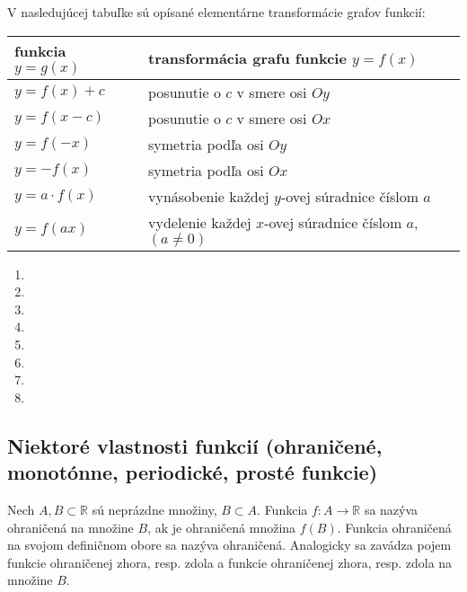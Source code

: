 V nasledujúcej tabuľke sú opísané elementárne transformácie grafov funkcií:

\begin{center}
  \begin{tabular}{|p{}|p{}|}
    \hline
    {\bf funkcia $y=g(x)$} & {\bf transformácia grafu funkcie $y=f(x)$}  \\
    \hline
    $y = f(x) + c$     & posunutie o $c$ v smere osi $Oy$ \\
    $y = f(x - c)$     & posunutie o $c$ v smere osi $Ox$ \\
    $y = f(-x)$        & symetria podľa osi $Oy$ \\
    $y = -f(x)$        & symetria podľa osi $Ox$ \\
    $y = a \cdot f(x)$ & vynásobenie každej $y$-ovej súradnice číslom $a$ \\
    $y = f(ax)$        & vydelenie každej $x$-ovej súradnice číslom $a$, $(a \neq 0)$ \\
    \hline
  \end{tabular}
\end{center}

\begin{enumerate}[resume]
  \showanswers
  \item {}
  \hideanswers
  \item {}
  \item {}
  \showanswers
  \item {}
  \item {}
  \hideanswers
  \item {}
  \item {}
  \item {}
\end{enumerate}


\subsection{Niektoré vlastnosti funkcií (ohraničené, monotónne, periodické, prosté funkcie)}

Nech $A,B\subset\mathbb{R}$ sú neprázdne množiny, $B\subset A$. Funkcia
$f:A\rightarrow\mathbb{R}$ sa nazýva ohraničená na množine $B$, ak je ohraničená
množina $f(B)$. Funkcia ohraničená na svojom definičnom obore sa nazýva
ohraničená. Analogicky sa zavádza pojem funkcie ohraničenej zhora, resp. zdola a
funkcie ohraničenej zhora, resp. zdola na množine $B$.


